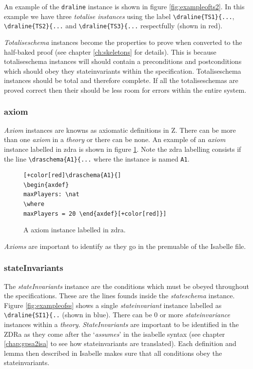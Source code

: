 An example of the \verb|draline| instance is shown in figure \ref{fig:exampleofts2}. In this example we have three \emph{totalise instances}
using the label \verb|\draline{TS1}{...|, \verb|\draline{TS2}{...| and
\verb|\draline{TS3}{...| respectfully (shown in red).

\emph{Totaliseschema} instances become the properties to prove when converted to the
half-baked proof (see chapter \ref{ch:skeletons} for details). This is because
totaliseschema instances will should contain a preconditions and postconditions
which should obey they stateinvariants within the specification. Totaliseschema
instances should be total and therefore complete. If all the totaliseschemas are
proved correct then their should be less room for errors within the entire
system.


\subsubsection{axiom}

\emph{Axiom} instances are knowns as axiomatic definitions in Z. There can be
more than one \emph{axiom} in a \emph{theory} or there can be none. An example
of an \emph{axiom} instance labelled in \gls{zdra} is shown in figure
\ref{fig:exampleofa}. Note the \gls{zdra} labelling consists if the line
\verb|\draschema{A1}{...| where the instance is named \verb|A1|.

\begin{figure}[H]
\centering
\begin{footnotesize}
\begin{BVerbatim}[commandchars=+\[\]]
[+color[red]\draschema{A1}{]
\begin{axdef}
maxPlayers: \nat
\where
maxPlayers = 20 \end{axdef}[+color[red]}]
\end{BVerbatim}
\end{footnotesize}
\caption{\label{fig:exampleofa} A axiom instance labelled in \gls{zdra}.}
\end{figure}

\emph{Axioms} are important to identify as they go in the premuable of the
Isabelle file.

\subsubsection{stateInvariants}
The \emph{stateInvariants} instance are the conditions which must be obeyed
throughout the specifications. These are the lines founds inside the
\emph{stateschema} instance. Figure \ref{fig:exampleofss} shows a single
\emph{stateinvariant} instance labelled as \verb|\draline{SI1}{..| (shown in
blue). There can be 0 or more \emph{stateinvariance} instances within a
\emph{theory}. \emph{StateInvariants} are important to be identified in the ZDRa
as they come after the `\emph{assumes}' in the isabelle syntax (see chapter
\ref{chap:gpsa2isa} to see how stateinvariants are translated). Each definition
and lemma then described in Isabelle makes sure that all conditions obey the stateinvariants.

